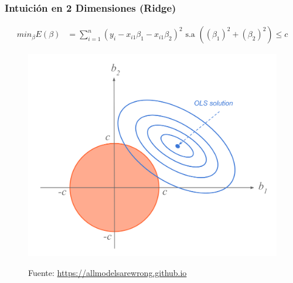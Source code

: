 \documentclass[
  shownotes,
  xcolor={svgnames},
  hyperref={colorlinks,citecolor=DarkBlue,linkcolor=DarkRed,urlcolor=DarkBlue}
  , aspectratio=169]{beamer}
\begin{document}
\begin{frame}[fragile]
\frametitle{Intuición en 2 Dimensiones (Ridge)}

\begin{align}
     min_{\beta} E(\beta) &= \sum_{i=1}^n (y_i - x_{i1}\beta_1 - x_{i1}\beta_2)^2  \text{ s.a }   \left( (\beta_1)^2 + (\beta_2)^2 \right) \leq c 
  \end{align}

\begin{figure}[H] \centering
            \captionsetup{justification=centering}
              \includegraphics[scale=0.3]{figures/ridge1}
 
\tiny
Fuente: \url{https://allmodelsarewrong.github.io}
\end{figure}


\end{frame}
\end{document}
